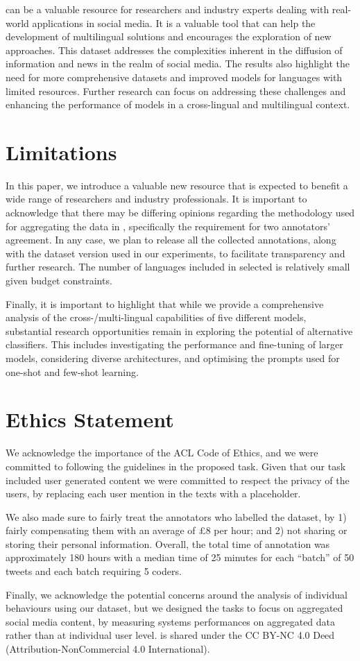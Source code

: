 {\XTOPIC} can be a valuable resource for researchers and industry experts dealing with real-world applications in social media. It is a valuable tool that can help the development of multilingual solutions and encourages the exploration of new approaches. This dataset addresses the complexities inherent in the diffusion of information and news in the realm of social media. The results also highlight the need for more comprehensive datasets and improved models for languages with limited resources. Further research can focus on addressing these challenges and enhancing the performance of models in a cross-lingual and multilingual context.

\section{Limitations}
In this paper, we introduce a valuable new resource that is expected to benefit a wide range of researchers and industry professionals. It is important to acknowledge that there may be differing opinions regarding the methodology used for aggregating the data in {\XTOPIC}, specifically the requirement for two annotators' agreement. In any case, we plan to release all the collected annotations, along with the dataset version used in our experiments, to facilitate transparency and further research. The number of languages included in {\XTOPIC} selected is relatively small given budget constraints.

Finally, it is important to highlight that while we provide a comprehensive analysis of the cross-/multi-lingual capabilities of five different models, substantial research opportunities remain in exploring the potential of alternative classifiers. This includes investigating the performance and fine-tuning of larger models, considering diverse architectures, and optimising the prompts used for one-shot and few-shot learning.

\section{Ethics Statement}
We acknowledge the importance of the ACL Code of Ethics, and we were committed to following the guidelines in the proposed task. Given that our task included user generated content we were committed to respect the privacy of the users, by replacing each user mention in the texts with a placeholder. 

We also made sure to fairly treat the annotators who labelled the dataset, by 1) fairly compensating them with an average of £8 per hour; and 2) not sharing or storing their personal information. Overall, the total time of annotation was approximately 180 hours with a median time of 25 minutes for each ``batch'' of 50 tweets and each batch requiring 5 coders.

Finally, we acknowledge the potential concerns around the analysis of individual behaviours using our dataset, but we designed the tasks to focus on aggregated social media content, by measuring systems performances on aggregated data rather than at individual user level. 
{\XTOPIC}  is shared under the CC BY-NC 4.0 Deed (Attribution-NonCommercial 4.0 International).